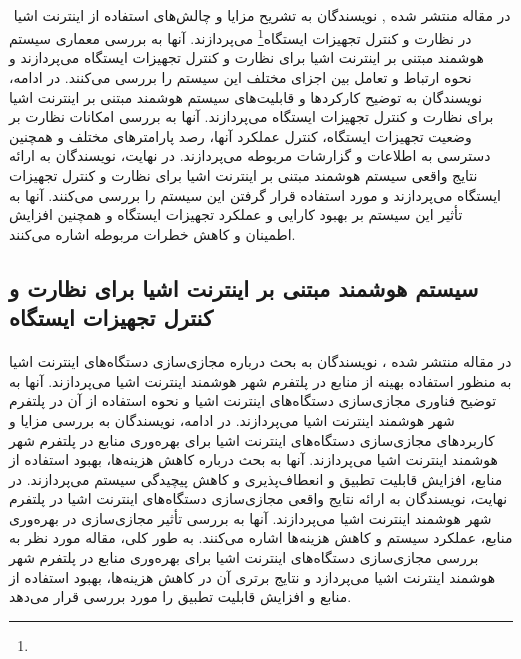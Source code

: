 \paragraph{}{‍
    در مقاله منتشر شده \cite{HOSSAIN2019100085}, نویسندگان به تشریح مزایا و چالش‌های استفاده از اینترنت اشیا در نظارت و کنترل تجهیزات ایستگاه\footnote{} می‌پردازند.
    آنها به بررسی معماری سیستم هوشمند مبتنی بر اینترنت اشیا برای نظارت و کنترل تجهیزات ایستگاه می‌پردازند و 
    نحوه ارتباط و تعامل بین اجزای مختلف این سیستم را بررسی می‌کنند. در ادامه، نویسندگان به توضیح کارکردها و 
    قابلیت‌های سیستم هوشمند مبتنی بر اینترنت اشیا برای نظارت و کنترل تجهیزات ایستگاه می‌پردازند. آنها به 
    بررسی امکانات نظارت بر وضعیت تجهیزات ایستگاه، کنترل عملکرد آنها، رصد پارامترهای مختلف و همچنین دسترسی 
    به اطلاعات و گزارشات مربوطه می‌پردازند. در نهایت، نویسندگان به ارائه نتایج واقعی سیستم هوشمند مبتنی بر اینترنت 
    اشیا برای نظارت و کنترل تجهیزات ایستگاه می‌پردازند و مورد استفاده قرار گرفتن این سیستم را بررسی می‌کنند. 
    آنها به تأثیر این سیستم بر بهبود کارایی و عملکرد تجهیزات ایستگاه و همچنین افزایش اطمینان و کاهش خطرات
    مربوطه اشاره می‌کنند.
‍}

\subsection{
    سیستم هوشمند مبتنی بر اینترنت اشیا برای نظارت و کنترل تجهیزات ایستگاه
}
\label{subsec:iot_device_virtualization}
\paragraph{}{
    در مقاله منتشر شده \cite{8730806}، نویسندگان به بحث درباره مجازی‌سازی دستگاه‌های اینترنت اشیا به منظور استفاده
    بهینه از منابع در پلتفرم شهر هوشمند اینترنت اشیا می‌پردازند. آنها به توضیح فناوری مجازی‌سازی دستگاه‌های اینترنت
    اشیا و نحوه استفاده از آن در پلتفرم شهر هوشمند اینترنت اشیا می‌پردازند. در ادامه، نویسندگان به بررسی مزایا و 
    کاربردهای مجازی‌سازی دستگاه‌های اینترنت اشیا برای بهره‌وری منابع در پلتفرم شهر هوشمند اینترنت اشیا می‌پردازند. 
    آنها به بحث درباره کاهش هزینه‌ها، بهبود استفاده از منابع، افزایش قابلیت تطبیق و انعطاف‌پذیری و کاهش پیچیدگی 
    سیستم می‌پردازند. در نهایت، نویسندگان به ارائه نتایج واقعی مجازی‌سازی دستگاه‌های اینترنت اشیا در پلتفرم شهر هوشمند 
    اینترنت اشیا می‌پردازند. آنها به بررسی تأثیر مجازی‌سازی در بهره‌وری منابع، عملکرد سیستم و کاهش هزینه‌ها اشاره
    می‌کنند. به طور کلی، مقاله مورد نظر به بررسی مجازی‌سازی دستگاه‌های اینترنت اشیا برای بهره‌وری منابع در پلتفرم شهر
    هوشمند اینترنت اشیا می‌پردازد و نتایج برتری آن در کاهش هزینه‌ها، بهبود استفاده از منابع و افزایش قابلیت تطبیق را
    مورد بررسی قرار می‌دهد.
‍}
